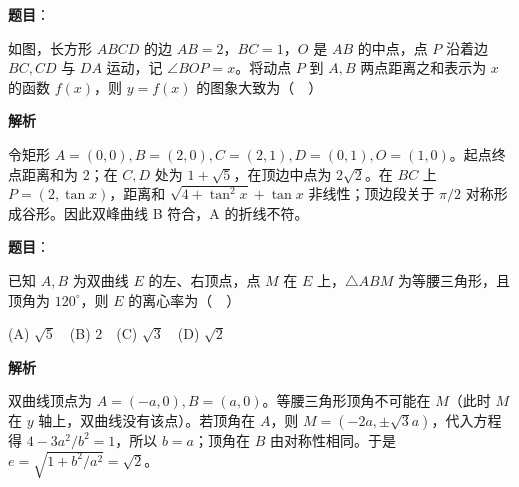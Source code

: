 \begin{answer}

\textbf{题目}：

如图，长方形 $ABCD$ 的边 $AB=2$，$BC=1$，$O$ 是 $AB$ 的中点，点 $P$ 沿着边 $BC,CD$ 与 $DA$ 运动，记 $\angle BOP=x$。将动点 $P$ 到 $A,B$ 两点距离之和表示为 $x$ 的函数 $f(x)$，则 $y=f(x)$ 的图象大致为（　）
\nopagebreak[4]
\begin{center}\end{center}
\nopagebreak[4]
\nopagebreak[4]
\begin{center}\end{center}
\nopagebreak[4]
\nopagebreak[4]
\begin{center}\end{center}
\nopagebreak[4]
\nopagebreak[4]
\begin{center}\end{center}
\nopagebreak[4]
\nopagebreak[4]
\begin{center}\end{center}
\nopagebreak[4]
\textbf{解析}

令矩形 $A=(0,0),B=(2,0),C=(2,1),D=(0,1),O=(1,0)$。起点终点距离和为 $2$；在 $C,D$ 处为 $1+\sqrt5$，在顶边中点为 $2\sqrt2$。在 $BC$ 上 $P=(2,\tan x)$，距离和 $\sqrt{4+\tan^2x}+\tan x$ 非线性；顶边段关于 $\pi/2$ 对称形成谷形。因此双峰曲线 B 符合，A 的折线不符。


\end{answer}
\begin{answer}

\textbf{题目}：

已知 $A,B$ 为双曲线 $E$ 的左、右顶点，点 $M$ 在 $E$ 上，$\triangle ABM$ 为等腰三角形，且顶角为 $120^\circ$，则 $E$ 的离心率为（　）

(A) $\sqrt5$　(B) $2$　(C) $\sqrt3$　(D) $\sqrt2$

\textbf{解析}

双曲线顶点为 $A=(-a,0),B=(a,0)$。等腰三角形顶角不可能在 $M$（此时 $M$ 在 $y$ 轴上，双曲线没有该点）。若顶角在 $A$，则 $M=(-2a,\pm\sqrt3a)$，代入方程得 $4-3a^2/b^2=1$，所以 $b=a$；顶角在 $B$ 由对称性相同。于是 $e=\sqrt{1+b^2/a^2}=\sqrt2$。


\end{answer}
